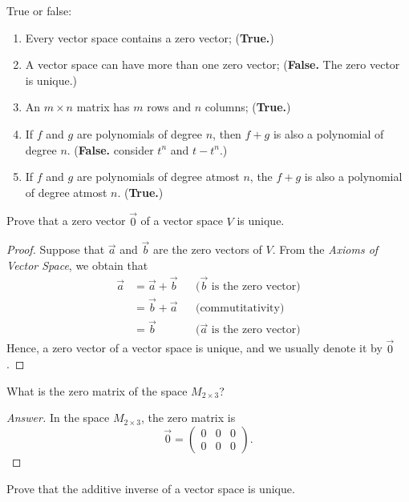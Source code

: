 \begin{exercise}
  True or false:
  \begin{enumerate}
    \item Every vector space contains a zero vector;
      (\textbf{True.})
    \item A vector space can have more than one zero vector;
      (\textbf{False.} The zero vector is unique.)
    \item An $m\times n$ matrix has $m$ rows and $n$ columns;
      (\textbf{True.})
    \item If $f$ and $g$ are polynomials of degree $n$, then $f+g$
      is also a polynomial of degree $n$.
      (\textbf{False.} consider $t^n$ and $t-t^n$.)
    \item If $f$ and $g$ are polynomials of degree atmost $n$, the $f+g$
      is also a polynomial of degree atmost $n$.
      (\textbf{True.})
  \end{enumerate}
\end{exercise}
\begin{exercise}
  Prove that a zero vector $\vec{0}$ of a vector space $V$ is
  unique.
\end{exercise}
\begin{proof}
  Suppose that $\vec{a}$ and $\vec{b}$ are the zero vectors of $V$.
  From the \emph{Axioms of Vector Space}, we obtain that
  \begin{align*}
    \vec{a}
      &=\vec{a}+\vec{b} && \text{($\vec{b}$ is the zero vector)}\\
      &=\vec{b}+\vec{a} && \text{(commutitativity)}\\
      &=\vec{b}         && \text{($\vec{a}$ is the zero vector)}
  \end{align*}
  Hence, a zero vector of a vector space is unique,
  and we usually denote it by $\vec{0}$.
\end{proof}
\begin{exercise}
  What is the zero matrix of the space $M_{2\times 3}$?
\end{exercise}
\begin{proof}[Answer]
  In the space $M_{2\times 3}$, the zero matrix is 
  \[
    \vec{0}=
    \begin{pmatrix}
      0&0&0\\
      0&0&0
    \end{pmatrix}.
  \]
\end{proof}
\begin{exercise}
  Prove that the additive inverse of a vector space is unique.
\end{exercise}
